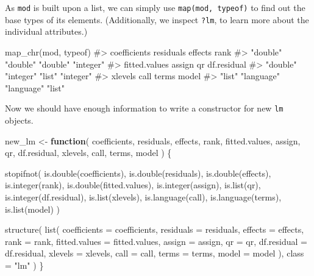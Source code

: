 \documentclass[
]{krantz}
\makeatletter
\newenvironment{Shaded}{\begin{snugshade}}{\end{snugshade}}
\newcommand{\CommentTok}[1]{\textcolor[rgb]{0.56,0.35,0.01}{\textit{#1}}}
\newcommand{\ControlFlowTok}[1]{\textcolor[rgb]{0.13,0.29,0.53}{\textbf{#1}}}
\newcommand{\DataTypeTok}[1]{\textcolor[rgb]{0.13,0.29,0.53}{#1}}
\newcommand{\KeywordTok}[1]{\textcolor[rgb]{0.13,0.29,0.53}{\textbf{#1}}}
\newcommand{\NormalTok}[1]{#1}
\newcommand{\StringTok}[1]{\textcolor[rgb]{0.31,0.60,0.02}{#1}}
\newenvironment{kframe}{%
\medskip{}
\setlength{\fboxsep}{.8em}
 \def\at@end@of@kframe{}%
 \ifinner\ifhmode%
  \def\at@end@of@kframe{\end{minipage}}%
  \begin{minipage}{\columnwidth}%
 \fi\fi%
 \def\FrameCommand##1{\hskip\@totalleftmargin \hskip-\fboxsep
 \colorbox{shadecolor}{##1}\hskip-\fboxsep
     \hskip-\linewidth \hskip-\@totalleftmargin \hskip\columnwidth}%
 \MakeFramed {\advance\hsize-\width
   \@totalleftmargin\z@ \linewidth\hsize
   \@setminipage}}%
 {\par\unskip\endMakeFramed%
 \at@end@of@kframe}
\renewenvironment{Shaded}{\begin{kframe}}{\end{kframe}}
\renewcommand{\KeywordTok} [1]{\textcolor[rgb]{0.00,0.44,0.13}{{#1}}}
\renewcommand{\DataTypeTok}[1]{\textcolor[rgb]{0.56,0.13,0.00}{{#1}}}
\renewcommand{\StringTok}  [1]{\textcolor[rgb]{0.25,0.44,0.63}{{#1}}}
\renewcommand{\CommentTok} [1]{\textcolor[rgb]{0.38,0.63,0.69}{{#1}}}
\renewcommand{\NormalTok}  [1]{{#1}}
\makeatother
\begin{document}
As \texttt{mod} is built upon a list, we can simply use \texttt{map(mod,\ typeof)} to find out the base types of its elements. (Additionally, we inspect \texttt{?lm}, to learn more about the individual attributes.)

\begin{Shaded}
\begin{Highlighting}[]
\KeywordTok{map_chr}\NormalTok{(mod, typeof)}
\CommentTok{#>  coefficients     residuals       effects          rank }
\CommentTok{#>      "double"      "double"      "double"     "integer" }
\CommentTok{#> fitted.values        assign            qr   df.residual }
\CommentTok{#>      "double"     "integer"        "list"     "integer" }
\CommentTok{#>       xlevels          call         terms         model }
\CommentTok{#>        "list"    "language"    "language"        "list"}
\end{Highlighting}
\end{Shaded}

Now we should have enough information to write a constructor for new \texttt{lm} objects.

\begin{Shaded}
\begin{Highlighting}[]
\NormalTok{new_lm <-}\StringTok{ }\ControlFlowTok{function}\NormalTok{(}
\NormalTok{  coefficients, residuals, effects, rank, fitted.values, assign,}
\NormalTok{  qr, df.residual, xlevels, call, terms, model}
\NormalTok{) \{}
  
  \KeywordTok{stopifnot}\NormalTok{(}
    \KeywordTok{is.double}\NormalTok{(coefficients), }\KeywordTok{is.double}\NormalTok{(residuals), }
    \KeywordTok{is.double}\NormalTok{(effects), }\KeywordTok{is.integer}\NormalTok{(rank), }\KeywordTok{is.double}\NormalTok{(fitted.values),}
    \KeywordTok{is.integer}\NormalTok{(assign), }\KeywordTok{is.list}\NormalTok{(qr), }\KeywordTok{is.integer}\NormalTok{(df.residual),}
    \KeywordTok{is.list}\NormalTok{(xlevels), }\KeywordTok{is.language}\NormalTok{(call), }\KeywordTok{is.language}\NormalTok{(terms),}
    \KeywordTok{is.list}\NormalTok{(model)}
\NormalTok{  )}
  
  \KeywordTok{structure}\NormalTok{(}
    \KeywordTok{list}\NormalTok{(}
      \DataTypeTok{coefficients =}\NormalTok{ coefficients,}
      \DataTypeTok{residuals =}\NormalTok{ residuals,}
      \DataTypeTok{effects =}\NormalTok{ effects,}
      \DataTypeTok{rank =}\NormalTok{ rank, }
      \DataTypeTok{fitted.values =}\NormalTok{ fitted.values,}
      \DataTypeTok{assign =}\NormalTok{ assign,}
      \DataTypeTok{qr =}\NormalTok{ qr,}
      \DataTypeTok{df.residual =}\NormalTok{ df.residual,}
      \DataTypeTok{xlevels =}\NormalTok{ xlevels,}
      \DataTypeTok{call =}\NormalTok{ call,}
      \DataTypeTok{terms =}\NormalTok{ terms, }
      \DataTypeTok{model =}\NormalTok{ model}
\NormalTok{    ),}
    \DataTypeTok{class =} \StringTok{"lm"}
\NormalTok{  )}
\NormalTok{\}}
\end{Highlighting}
\end{Shaded}
\end{document}
